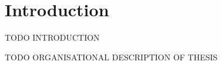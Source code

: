 \chapter{Introduction}
\label{chp:introduction}
TODO INTRODUCTION

\vspace{1\baselineskip}

\noindent
TODO ORGANISATIONAL DESCRIPTION OF THESIS

